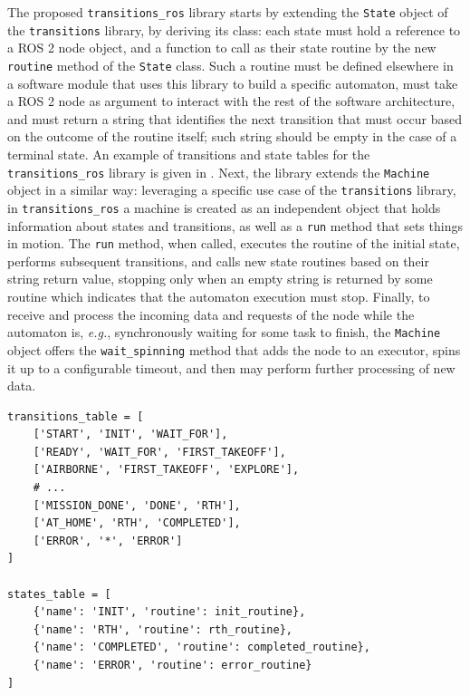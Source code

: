 The proposed \texttt{transitions\_ros} library \cite{masocco_transitions_ros_2022} starts by extending the \texttt{State} object of the \texttt{transitions} library, by deriving its class: each state must hold a reference to a ROS 2 node object, and a function to call as their state routine by the new \texttt{routine} method of the \texttt{State} class. Such a routine must be defined elsewhere in a software module that uses this library to build a specific automaton, must take a ROS 2 node as argument to interact with the rest of the software architecture, and must return a string that identifies the next transition that must occur based on the outcome of the routine itself; such string should be empty in the case of a terminal state. An example of transitions and state tables for the \texttt{transitions\_ros} library is given in . Next, the library extends the \texttt{Machine} object in a similar way: leveraging a specific use case of the \texttt{transitions} library, in \texttt{transitions\_ros} a machine is created as an independent object that holds information about states and transitions, as well as a \texttt{run} method that sets things in motion. The \texttt{run} method, when called, executes the routine of the initial state, performs subsequent transitions, and calls new state routines based on their string return value, stopping only when an empty string is returned by some routine which indicates that the automaton execution must stop. Finally, to receive and process the incoming data and requests of the node while the automaton is, \emph{e.g.}, synchronously waiting for some task to finish, the \texttt{Machine} object offers the \texttt{wait\_spinning} method that adds the node to an executor, spins it up to a configurable timeout, and then may perform further processing of new data.
\begin{center}
\begin{minipage}[t]{.9\textwidth}
\begin{lstlisting}[caption={Example of transitions and state tables in the \texttt{transitions\_ros} library \cite{masocco_transitions_ros_2022}.}, label={lst:transitions}]
transitions_table = [
    ['START', 'INIT', 'WAIT_FOR'],
    ['READY', 'WAIT_FOR', 'FIRST_TAKEOFF'],
    ['AIRBORNE', 'FIRST_TAKEOFF', 'EXPLORE'],
    # ...
    ['MISSION_DONE', 'DONE', 'RTH'],
    ['AT_HOME', 'RTH', 'COMPLETED'],
    ['ERROR', '*', 'ERROR']
]

states_table = [
    {'name': 'INIT', 'routine': init_routine},
    {'name': 'RTH', 'routine': rth_routine},
    {'name': 'COMPLETED', 'routine': completed_routine},
    {'name': 'ERROR', 'routine': error_routine}
]
\end{lstlisting}
\end{minipage}
\end{center}

